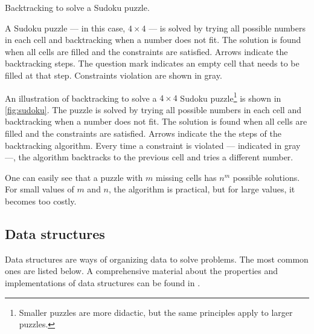 \begin{figurebox}[label=fig:sudoku]{Backtracking to solve a Sudoku puzzle.}
{
  }
  \tcblower
  A Sudoku puzzle --- in this case, $4 \times 4$ --- is solved by trying all possible
  numbers in each cell and backtracking when a number does not fit.  The solution is found
  when all cells are filled and the constraints are satisfied.  Arrows indicate the
  backtracking steps.  The question mark indicates an empty cell that needs to be filled
  at that step.  Constraints violation are shown in gray.
\end{figurebox}

An illustration of backtracking to solve a $4 \times 4$ Sudoku puzzle\footnote{%
Smaller puzzles are more didactic, but the same principles apply to larger puzzles.}
is shown in \cref{fig:sudoku}.
The puzzle is solved by trying all possible numbers in each cell and backtracking when a
number does not fit.  The solution is found when all cells are filled and the constraints
are satisfied.  Arrows indicate the the steps of the backtracking algorithm.  Every time a
constraint is violated --- indicated in gray ---, the algorithm backtracks to the previous
cell and tries a different number.

One can easily see that a puzzle with $m$ missing cells has $n^m$ possible solutions.  For
small values of $m$ and $n$, the algorithm is practical, but for large values, it becomes
too costly.

\subsection{Data structures}

Data structures are ways of organizing data to solve problems.  The most common ones
are listed below.  A comprehensive material about the properties and implementations of
data structures can be found in \textcite{Cormen2022}.

